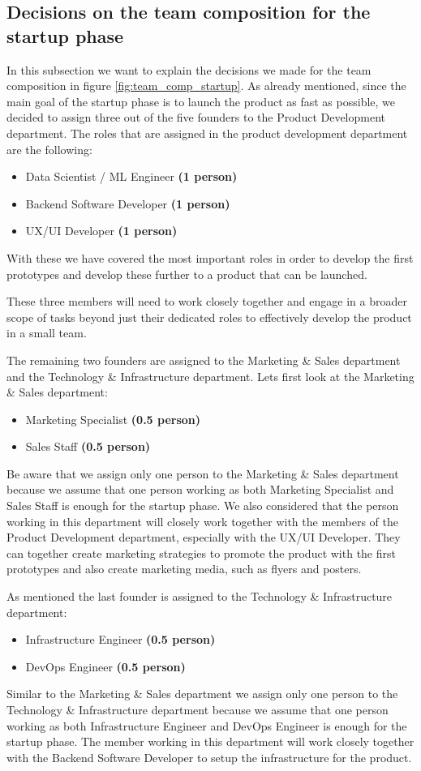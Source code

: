 \subsection{Decisions on the team composition for the startup phase}
\label{sub:decision_on_team_comp_startup}

In this subsection we want to explain the decisions we made for the team composition in figure \ref{fig:team_comp_startup}.
As already mentioned, since the main goal of the startup phase is to launch the product as fast as possible, we decided to assign three out of the five founders to the Product Development department.
The roles that are assigned in the product development department are the following:
\begin{itemize}
    \item Data Scientist / ML Engineer \textbf{(1 person)}
    \item Backend Software Developer \textbf{(1 person)}
    \item UX/UI Developer \textbf{(1 person)}
\end{itemize}
With these we have covered the most important roles in order to develop the first prototypes and develop these further to a product that can be launched.

These three members will need to work closely together and engage in a broader scope of tasks beyond just their dedicated roles to effectively develop the product in a small team.

\p
The remaining two founders are assigned to the Marketing \& Sales department and the Technology \& Infrastructure department.
Lets first look at the Marketing \& Sales department:
\begin{itemize}
    \item Marketing Specialist \textbf{(0.5 person)}
    \item Sales Staff \textbf{(0.5 person)}
\end{itemize}
Be aware that we assign only one person to the Marketing \& Sales department because we assume that one person working as both Marketing Specialist and Sales Staff is enough for the startup phase.
We also considered that the person working in this department will closely work together with the members of the Product Development department, especially with the UX/UI Developer.
They can together create marketing strategies to promote the product with the first prototypes and also create marketing media, such as flyers and posters.

\p
As mentioned the last founder is assigned to the Technology \& Infrastructure department:
\begin{itemize}
    \item Infrastructure Engineer \textbf{(0.5 person)}
    \item DevOps Engineer \textbf{(0.5 person)}
\end{itemize}
Similar to the Marketing \& Sales department we assign only one person to the Technology \& Infrastructure department because we assume that one person working as both Infrastructure Engineer and DevOps Engineer is enough for the startup phase.
The member working in this department will work closely together with the Backend Software Developer to setup the infrastructure for the product.

